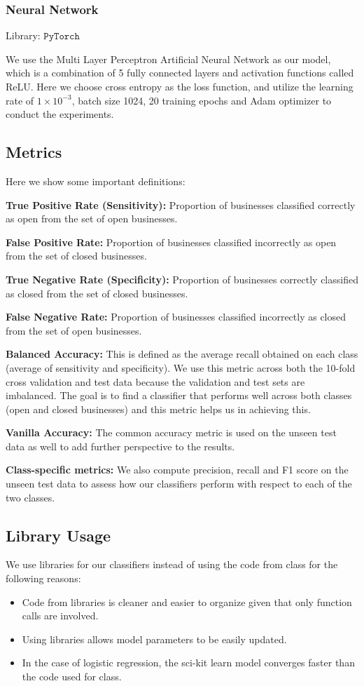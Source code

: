 \documentclass{article}
\begin{document}
\subsubsection{Neural Network}
Library:  $\texttt{PyTorch}$~\cite{NEURIPS2019_9015}

We use the Multi Layer Perceptron Artificial Neural Network as our model, which is a combination of 5 fully connected layers and activation functions  called ReLU. Here we choose cross entropy as the loss function, and utilize the learning rate of $1 \times 10^{-3}$, batch size 1024,  20 training epochs and Adam optimizer to conduct the experiments. 




\subsection{Metrics}
\label{mets}
Here we show some important definitions:

\textbf{True Positive Rate (Sensitivity):}  Proportion of businesses classified correctly as open from the set of open businesses.

\textbf{False Positive Rate:}  Proportion of businesses classified incorrectly as open from the set of closed businesses.

\textbf{True Negative Rate (Specificity):}  Proportion of businesses correctly classified as closed from the set of closed businesses.

\textbf{False Negative Rate:}  Proportion of businesses classified incorrectly as closed from the set of open businesses. 

\textbf{Balanced Accuracy:} This is defined as the average recall obtained on each class (average of sensitivity and specificity). We use this metric across both the 10-fold cross validation and test data because the validation and test sets are imbalanced. The goal is to find a classifier that performs well across both classes (open and closed businesses) and this metric helps us in achieving this. 

\textbf{Vanilla Accuracy:} The common accuracy metric is used on the unseen test data as well to add further perspective to the results.


\textbf{Class-specific metrics:}  We also compute precision, recall and F1 score on the unseen test data to assess how our classifiers perform with respect to each of the two classes. 

\subsection{Library Usage}
We use libraries for our classifiers instead of using the code from class for the following reasons:
\begin{itemize}[leftmargin=*]
\item Code from libraries is cleaner and easier to organize given that only function calls are involved.
\item Using libraries allows model parameters to be easily updated.
\item In the case of logistic regression, the sci-kit learn model converges faster than the code used for class.
\end{itemize}
\end{document}
